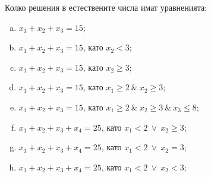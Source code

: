 \begin{problem}
  Колко решения в естествените числа имат уравненията:
  \begin{enumerate}[a)]
  \item
    $x_1+x_2+x_3 = 15$;
  \item
    $x_1 + x_2 + x_3 = 15$, като $x_2 < 3$;
  \item
    $x_1 + x_2 + x_3 = 15$, като $x_2 \geq 3$;
  \item
    $x_1+x_2+x_3 = 15$, като $x_1 \geq 2\ \&\ x_2 \geq 3$;
  \item
    $x_1+x_2+x_3 = 15$, като $x_1 \geq 2\ \&\ x_2 \geq 3\ \&\ x_3 \leq 8$;
  \item
    $x_1+x_2+x_3+x_4 = 25$, като $x_1 < 2\ \vee\ x_2 \geq 3$;
  \item
    $x_1+x_2+x_3+x_4 = 25$, като $x_1 < 2\ \vee\ x_2 = 3$;
  \item
    $x_1+x_2+x_3+x_4 = 25$, като $x_1 < 2\ \vee\ x_2 < 3$;
  \end{enumerate}
\end{problem}
